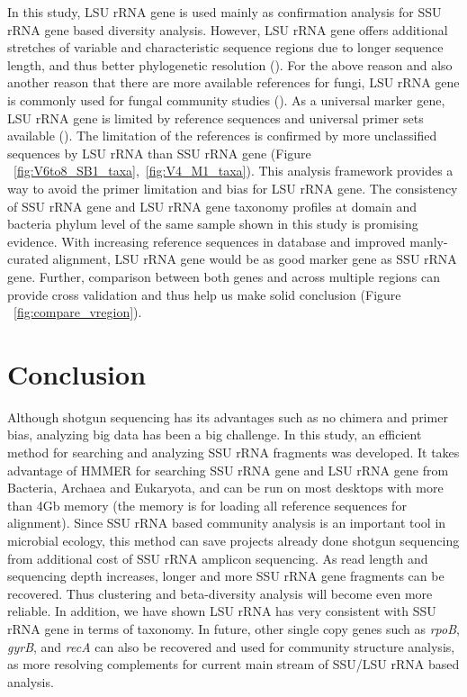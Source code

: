 \documentclass[12pt]{article}
\begin{document}
In this study, LSU rRNA gene is used mainly as confirmation analysis
for SSU rRNA gene based diversity analysis. However, LSU rRNA gene
offers additional stretches of variable and characteristic sequence
regions due to longer sequence length, and thus better phylogenetic
resolution (\cite{lsuprimer}). For the above reason and also another
reason that there are more available references for fungi, LSU rRNA
gene is commonly used for fungal community studies
(\cite{lsufungal2007,lsuclassifier,lsufungal2012,lsufungal2010}). As a
universal marker gene, LSU rRNA gene is limited by reference sequences
and universal primer sets available (\cite{lsuprimer}). The limitation
of the references is confirmed by more unclassified sequences by LSU
rRNA than SSU rRNA gene (Figure
~\ref{fig:V6to8_SB1_taxa},~\ref{fig:V4_M1_taxa}). This analysis
framework provides a way to avoid the primer limitation and bias for
LSU rRNA gene. The consistency of SSU rRNA gene and LSU rRNA gene
taxonomy profiles at domain and bacteria phylum level of the same
sample shown in this study is promising evidence. With increasing
reference sequences in database and improved manly-curated alignment,
LSU rRNA gene would be as good marker gene as SSU rRNA gene. Further,
comparison between both genes and across multiple regions can provide
cross validation and thus help us make solid conclusion (Figure
~\ref{fig:compare_vregion}).

\section{Conclusion}
Although shotgun sequencing has its advantages such as no chimera and
primer bias, analyzing big data has been a big challenge. In this
study, an efficient method for searching and analyzing SSU rRNA
fragments was developed. It takes advantage of HMMER for searching SSU
rRNA gene and LSU rRNA gene from Bacteria, Archaea and Eukaryota, and
can be run on most desktops with more than 4Gb memory (the memory is
for loading all reference sequences for alignment). Since SSU rRNA
based community analysis is an important tool in microbial ecology,
this method can save projects already done shotgun sequencing from
additional cost of SSU rRNA amplicon sequencing. As read length and
sequencing depth increases, longer and more SSU rRNA gene fragments
can be recovered. Thus clustering and beta-diversity analysis will
become even more reliable. In addition, we have shown LSU rRNA has
very consistent with SSU rRNA gene in terms of taxonomy. In future,
other single copy genes such as {\em rpoB}, {\em gyrB}, and {\em recA}
can also be recovered and used for community structure analysis, as
more resolving complements for current main stream of SSU/LSU rRNA
based analysis.
\end{document}
